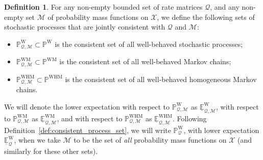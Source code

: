 \documentclass[10pt,a4paper]{paper}
\theoremstyle{definition}
\newtheorem{definition}{Definition}
\newcommand{\states}{\mathcal{X}}
\newcommand{\processes}{\mathbb{P}}
\newcommand{\wprocesses}{\processes^{\mathrm{W}}}
\newcommand{\wmprocesses}{\processes^{\mathrm{WM}}}
\newcommand{\whmprocesses}{\processes^{\mathrm{WHM}}}
\newcommand{\rateset}{\mathcal{Q}}
\begin{document}
\begin{definition}\label{def:process_sets}
For any non-empty bounded set of rate matrices $\rateset$, and any non-empty set $\mathcal{M}$ of probability mass functions on $\states$, we define the following sets of stochastic processes that are jointly consistent with $\rateset$ and $\mathcal{M}$:
\begin{itemize}
\item $\wprocesses_{\rateset,\mathcal{M}}\subset\wprocesses$ is the consistent set of all well-behaved stochastic processes;
\item $\wmprocesses_{\rateset,\mathcal{M}}\subset\wmprocesses$ is the consistent set of all well-behaved Markov chains;
\item $\whmprocesses_{\rateset,\mathcal{M}}\subset\whmprocesses$ is the consistent set of all well-behaved homogeneous Markov chains.
\end{itemize}
We will denote the lower expectation with respect to $\wprocesses_{\rateset,\mathcal{M}}$ as $\underline{\mathbb{E}}_{\rateset,\mathcal{M}}^{\mathrm{W}}$, with respect to $\wmprocesses_{\rateset,\mathcal{M}}$ as $\underline{\mathbb{E}}_{\rateset,\mathcal{M}}^{\mathrm{WM}}$, and with respect to  $\whmprocesses_{\rateset,\mathcal{M}}$ as $\underline{\mathbb{E}}_{\rateset,\mathcal{M}}^{\mathrm{WHM}}$. Following Definition~\ref{def:consistent_process_set}, we will write $\wprocesses_{\rateset}$, with lower expectation $\underline{\mathbb{E}}_{\rateset}^{\mathrm{W}}$, when we take $\mathcal{M}$ to be the set of \emph{all} probability mass functions on $\states$ (and similarly for these other sets). 
\end{definition}

\end{document}
